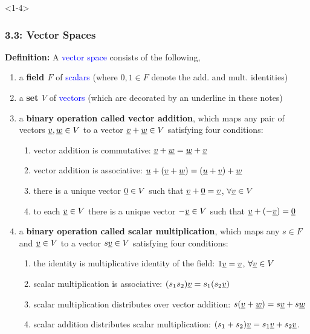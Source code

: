 \documentclass[10pt,english,aspectratio=169]{beamer}
\begin{document}
\begin{frame}<1-4> \frametitle{3.3: Vector Spaces}

\textbf{Definition:} A \textcolor{blue}{vector space} consists of the following,
\begin{enumerate}
\item<1-> a {\bf \boldmath field $F$} of \textcolor{blue}{scalars} (where $0,1 \in F$ denote the add. and mult. identities)
\item<2-> a {\bf \boldmath set $V$} of \textcolor{blue}{vectors} (which are decorated by an underline in these notes)
\item<3-> a \textbf{binary operation called vector addition}, which maps any pair of vectors $\underline{v}, \underline{w} \in V$ to a vector $\underline{v} + \underline{w} \in V$ satisfying four conditions:
\begin{enumerate}
\item vector addition is commutative: $\underline{v} + \underline{w} = \underline{w} + \underline{v}$
\item vector addition is associative: $\underline{u} + (\underline{v} + \underline{w}) = (\underline{u} + \underline{v}) + \underline{w}$
\item there is a unique vector $\underline{0} \in V$ such that $\underline{v} + \underline{0} = \underline{v}$, $\forall \underline{v} \in V$
\item to each $\underline{v} \in V$ there is a unique vector $- \underline{v} \in V$ such that $\underline{v} + (- \underline{v}) = \underline{0}$
\end{enumerate}
\item<4-> a \textbf{binary operation called scalar multiplication}, which maps any $s \in F$ and $\underline{v} \in V$ to a vector $s \underline{v} \in V$ satisfying four conditions:
\begin{enumerate}
\item the identity is multiplicative identity of the field: $1 \underline{v} = \underline{v}$, $\forall \underline{v} \in V$
\item scalar multiplication is associative: $(s_1 s_2) \underline{v} = s_1 ( s_2 \underline{v} )$
\item scalar multiplication distributes over vector addition: $s ( \underline{v} + \underline{w} ) = s \underline{v} + s \underline{w}$
\item scalar addition distributes scalar multiplication: $(s_1 + s_2) \underline{v} = s_1 \underline{v} + s_2 \underline{v}$.
\end{enumerate}
\end{enumerate}


\end{frame}
\end{document}
